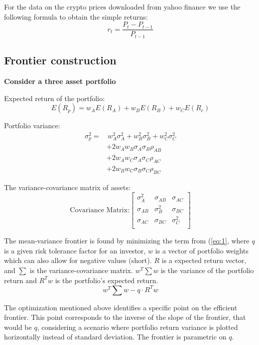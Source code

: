 \documentclass[12pt,a4paper]{article}
\begin{document}
\noindent For the data on the crypto prices downloaded from yahoo finance we use the following formula to obtain the simple 
returns: 
$$r_t = \frac{P_t-P_{t-1}}{P_{t-1}}$$

\subsection{Frontier construction}
\textbf{Consider a three asset portfolio}

Expected return of the portfolio:
$$E(R_p) = w_AE(R_A) + w_BE(R_B) + w_CE(R_c)$$

Portfolio variance: 
\begin{align*} %
\sigma^2_p = & \, w^2_A\sigma^2_A + w^2_B\sigma^2_B + w^2_C\sigma^2_C \\
            & + 2w_A w_B\sigma_A\sigma_B\rho_{AB} \\
            & + 2w_A w_C\sigma_A\sigma_C\rho_{AC} \\
            & + 2w_B w_C\sigma_B\sigma_C\rho_{BC}
\end{align*}


The variance-covariance matrix of assets: 
\[
\text{Covariance Matrix:}
\begin{bmatrix}
    \sigma_{A}^2 & \sigma_{AB} & \sigma_{AC} \\
    \sigma_{AB} & \sigma_{B}^2 & \sigma_{BC} \\
    \sigma_{AC} & \sigma_{BC} & \sigma_{C}^2 \\
\end{bmatrix}
\]

\noindent The mean-variance frontier is found by minimizing the term from (\ref{eq:1}, where $q$ is a given risk tolerance 
factor for an investor, $w$ is a vector of portfolio weights which can also allow for negative values (short). $R$ is a 
expected return vector, and $\sum$ is the variance-covariance matrix. $w^T\sum w$ is the variance of the portfolio return 
and $R^Tw$ is the portfolio's expected return.\cite{wikiref}
\begin{equation}\label{eq:1}
 w^T\sum w - q \cdot R^Tw    
\end{equation}

\noindent The optimization mentioned above identifies a specific point on the efficient frontier. This point corresponds to 
the inverse of the slope of the frontier, that would be $q$, considering a scenario where portfolio return variance is 
plotted horizontally instead of standard deviation. The frontier is parametric on $q$.\cite{wikiref}
\end{document}
